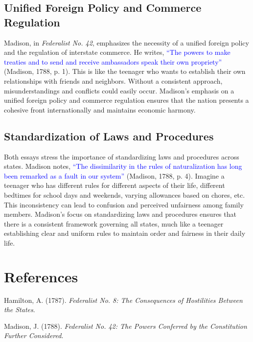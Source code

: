\documentclass[12pt]{article}
\begin{document}
\subsection{Unified Foreign Policy and Commerce Regulation}

Madison, in \textit{Federalist No. 42}, emphasizes the necessity of a unified foreign policy and the regulation of interstate commerce. He writes, \textcolor{blue}{“The powers to make treaties and to send and receive ambassadors speak their own propriety”} (Madison, 1788, p. 1). This is like the teenager who wants to establish their own relationships with friends and neighbors. Without a consistent approach, misunderstandings and conflicts could easily occur. Madison’s emphasis on a unified foreign policy and commerce regulation ensures that the nation presents a cohesive front internationally and maintains economic harmony.

\subsection{Standardization of Laws and Procedures}

Both essays stress the importance of standardizing laws and procedures across states. Madison notes, \textcolor{blue}{“The dissimilarity in the rules of naturalization has long been remarked as a fault in our system”} (Madison, 1788, p. 4). Imagine a teenager who has different rules for different aspects of their life, different bedtimes for school days and weekends, varying allowances based on chores, etc. This inconsistency can lead to confusion and perceived unfairness among family members. Madison’s focus on standardizing laws and procedures ensures that there is a consistent framework governing all states, much like a teenager establishing clear and uniform rules to maintain order and fairness in their daily life.


\newpage
\section*{References}

Hamilton, A. (1787). \textit{Federalist No. 8: The Consequences of Hostilities Between the States}. 

\noindent
Madison, J. (1788). \textit{Federalist No. 42: The Powers Conferred by the Constitution Further Considered}.
\end{document}
